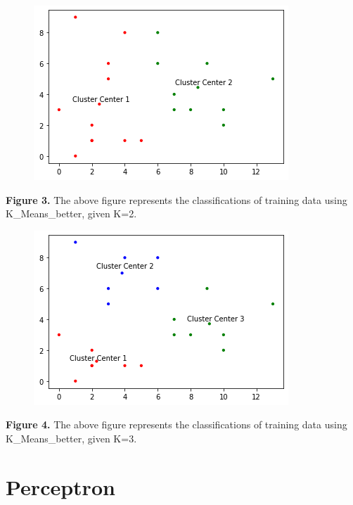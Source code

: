 \documentclass[11pt]{article}
\theoremstyle{definition}
\begin{document}
\begin{figure}[hbt!]
 \centering
 \includegraphics[scale=0.90]{Clustering_plot3}
\end{figure}
\textbf{Figure 3.} The above figure represents the classifications of training data using \textsf{K\_Means\_better}, given K=2. 

\begin{figure}[hbt!]
 \centering
 \includegraphics[scale=0.90]{Clustering_plot4}
\end{figure}
\textbf{Figure 4.} The above figure represents the classifications of training data using \textsf{K\_Means\_better}, given K=3. 

\section{Perceptron}
\end{document}

